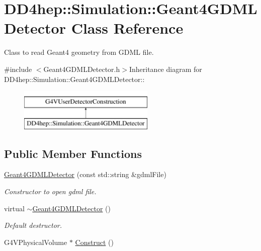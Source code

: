 \hypertarget{class_d_d4hep_1_1_simulation_1_1_geant4_g_d_m_l_detector}{
\section{DD4hep::Simulation::Geant4GDMLDetector Class Reference}
\label{class_d_d4hep_1_1_simulation_1_1_geant4_g_d_m_l_detector}
}


Class to read Geant4 geometry from GDML file.  


{\ttfamily \#include $<$Geant4GDMLDetector.h$>$}Inheritance diagram for DD4hep::Simulation::Geant4GDMLDetector::\begin{figure}[H]
\begin{center}
\leavevmode
\includegraphics[height=2cm]{class_d_d4hep_1_1_simulation_1_1_geant4_g_d_m_l_detector}
\end{center}
\end{figure}
\subsection*{Public Member Functions}
\begin{DoxyCompactItemize}
\item 
\hyperlink{class_d_d4hep_1_1_simulation_1_1_geant4_g_d_m_l_detector_a4bdf71880b0a663f8e2954eed4fc891d}{Geant4GDMLDetector} (const std::string \&gdmlFile)
\begin{DoxyCompactList}\small\item\em Constructor to open gdml file. \item\end{DoxyCompactList}\item 
virtual \hyperlink{class_d_d4hep_1_1_simulation_1_1_geant4_g_d_m_l_detector_aab64ff1905c8d9dc0374ab8eaeade7eb}{$\sim$Geant4GDMLDetector} ()
\begin{DoxyCompactList}\small\item\em Default destructor. \item\end{DoxyCompactList}\item 
G4VPhysicalVolume $\ast$ \hyperlink{class_d_d4hep_1_1_simulation_1_1_geant4_g_d_m_l_detector_ad7f7c697e1126a85187e06f94cbd4ad1}{Construct} ()
\end{DoxyCompactItemize}
